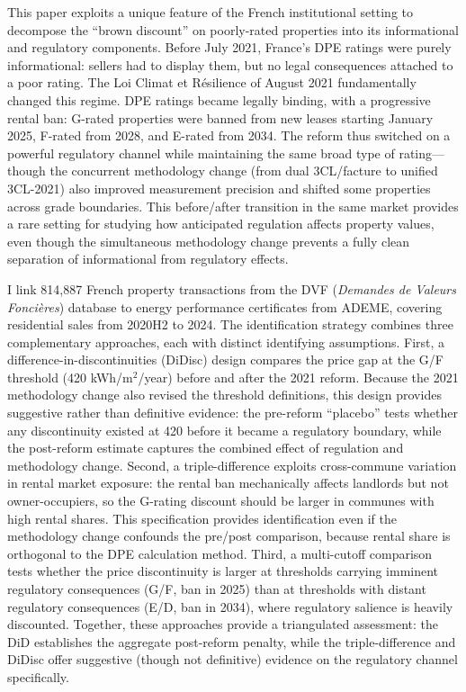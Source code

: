 \documentclass[12pt]{article}
\begin{document}
This paper exploits a unique feature of the French institutional setting to decompose the ``brown discount'' on poorly-rated properties into its informational and regulatory components. Before July 2021, France's DPE ratings were purely informational: sellers had to display them, but no legal consequences attached to a poor rating. The Loi Climat et R\'esilience of August 2021 fundamentally changed this regime. DPE ratings became legally binding, with a progressive rental ban: G-rated properties were banned from new leases starting January 2025, F-rated from 2028, and E-rated from 2034. The reform thus switched on a powerful regulatory channel while maintaining the same broad type of rating---though the concurrent methodology change (from dual 3CL/facture to unified 3CL-2021) also improved measurement precision and shifted some properties across grade boundaries. This before/after transition in the same market provides a rare setting for studying how anticipated regulation affects property values, even though the simultaneous methodology change prevents a fully clean separation of informational from regulatory effects.

I link 814,887 French property transactions from the DVF (\textit{Demandes de Valeurs Fonci\`eres}) database to energy performance certificates from ADEME, covering residential sales from 2020H2 to 2024. The identification strategy combines three complementary approaches, each with distinct identifying assumptions. First, a difference-in-discontinuities (DiDisc) design compares the price gap at the G/F threshold (420 kWh/m$^2$/year) before and after the 2021 reform. Because the 2021 methodology change also revised the threshold definitions, this design provides suggestive rather than definitive evidence: the pre-reform ``placebo'' tests whether any discontinuity existed at 420 before it became a regulatory boundary, while the post-reform estimate captures the combined effect of regulation and methodology change. Second, a triple-difference exploits cross-commune variation in rental market exposure: the rental ban mechanically affects landlords but not owner-occupiers, so the G-rating discount should be larger in communes with high rental shares. This specification provides identification even if the methodology change confounds the pre/post comparison, because rental share is orthogonal to the DPE calculation method. Third, a multi-cutoff comparison tests whether the price discontinuity is larger at thresholds carrying imminent regulatory consequences (G/F, ban in 2025) than at thresholds with distant regulatory consequences (E/D, ban in 2034), where regulatory salience is heavily discounted. Together, these approaches provide a triangulated assessment: the DiD establishes the aggregate post-reform penalty, while the triple-difference and DiDisc offer suggestive (though not definitive) evidence on the regulatory channel specifically.
\end{document}
